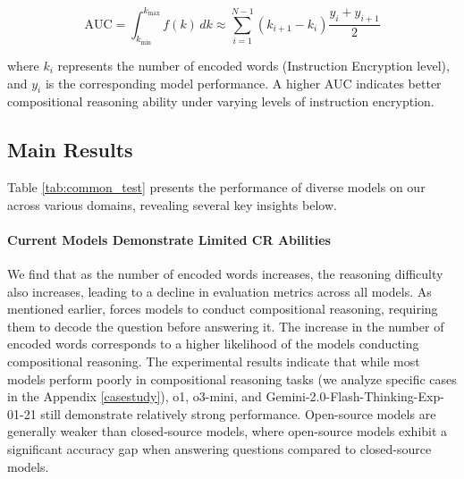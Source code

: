 \begin{equation}
    \text{AUC} = \int_{k_{\min}}^{k_{\max}} f(k) \,dk \approx \sum_{i=1}^{N-1} (k_{i+1} - k_i) \frac{y_i + y_{i+1}}{2}
\end{equation}

where \( k_i \) represents the number of encoded words (Instruction Encryption level), and \( y_i \) is the corresponding model performance.  
A higher AUC indicates better compositional reasoning ability under varying levels of instruction encryption.



\subsection{Main Results}
Table \ref{tab:common_test} presents the performance of diverse models on our \benchmark{} across various domains, revealing several key insights below. 

\paragraph{Current Models Demonstrate Limited CR Abilities} We find that as the number of encoded words increases, the reasoning difficulty also increases, leading to a decline in evaluation metrics across all models. 
As mentioned earlier, \benchmark{} forces models to conduct compositional reasoning, requiring them to decode the question before answering it. 
The increase in the number of encoded words corresponds to a higher likelihood of the models conducting compositional reasoning. 
The experimental results indicate that while most models perform poorly in compositional reasoning tasks (we analyze specific cases in the Appendix \ref{casestudy}), o1, o3-mini, and Gemini-2.0-Flash-Thinking-Exp-01-21 still demonstrate relatively strong performance. Open-source models are generally weaker than closed-source models, where open-source models exhibit a significant accuracy gap when answering questions compared to closed-source models. 




